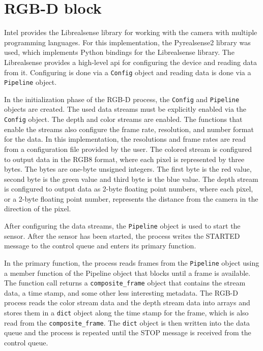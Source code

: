 \section{RGB-D block}
\label{sec:3-rgb-d}
Intel provides the Librealsense library for working with the camera with multiple programming languages.
For this implementation, the Pyrealsense2 library was used, which implements Python bindings for the Librealsense library. \cite{librealsense2}
The Librealsense provides a high-level \gls{api} for configuring the device and reading data from it.
Configuring is done via a \texttt{Config} object and reading data is done via a \texttt{Pipeline} object. \cite{librealsense2-python-docs}

In the initialization phase of the RGB-D process, the \texttt{Config} and \texttt{Pipeline} objects are created.
The used data streams must be explicitly enabled via the \texttt{Config} object.
The depth and color streams are enabled.
The functions that enable the streams also configure the frame rate, resolution, and number format for the data.
In this implementation, the resolutions and frame rates are read from a configuration file provided by the user.
The colored stream is configured to output data in the RGB8 format, where each pixel is represented by three bytes.
The bytes are one-byte unsigned integers. The first byte is the red value, second byte is the green value and third byte is the blue value.
The depth stream is configured to output data as 2-byte floating point numbers,
where each pixel, or a 2-byte floating point number, represents the distance from the camera in the direction of the pixel.

After configuring the data streams, the \texttt{Pipeline} object is used to start the sensor.
After the sensor has been started, the process writes the STARTED message to the control queue and enters its primary function.

In the primary function, the process reads frames from the \texttt{Pipeline} object using a member function of the Pipeline object that blocks until a frame is available.
The function call returns a \texttt{composite\_frame} object that contains the stream data, a time stamp, and some other less interesting metadata.
The RGB-D process reads the color stream data and the depth stream data into arrays and stores them in a \texttt{dict} object along the time stamp for the frame,
which is also read from the \texttt{composite\_frame}.
The \texttt{dict} object is then written into the data queue and the process is repeated until the STOP message is received from the control queue.


